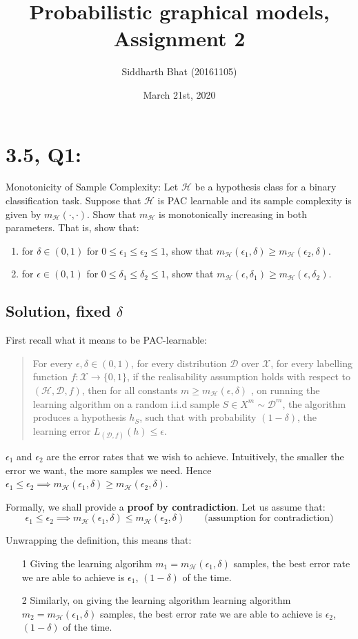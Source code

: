 \documentclass[11pt]{article}
\title{Probabilistic graphical models, Assignment 2}
\author{Siddharth Bhat (20161105)}
\date{March 21st, 2020}
\newcommand{\D}{\ensuremath{\mathcal{D}}}
\renewcommand{\H}{\ensuremath{\mathcal{H}}}
\newcommand{\X}{\ensuremath{\mathcal{X}}}
\begin{document}
\section*{3.5, Q1:}
Monotonicity of Sample Complexity: Let $\H$ be a hypothesis class for a
binary classification task. Suppose that $\H$ is PAC learnable and its sample
complexity is given by $m_\H (\cdot, \cdot)$. Show that $m_\H$ is monotonically
increasing in both parameters. That is, show that:
\begin{enumerate}
    \item for $\delta \in (0, 1)$ for $0 \leq \epsilon_1 \leq \epsilon_2 \leq 1$,
        show that $m_\H(\epsilon_1, \delta) \geq m_\H(\epsilon_2, \delta)$.
    \item  for $\epsilon \in (0, 1)$ for $0 \leq \delta_1 \leq \delta_2 \leq 1$,
        show that $m_\H(\epsilon, \delta_1) \geq m_\H(\epsilon, \delta_2)$.
\end{enumerate}
\subsection*{Solution, fixed $\delta$}
First recall what it means to be PAC-learnable:

\begin{quote}
For every $\epsilon, \delta \in (0, 1)$, for every distribution $\D$ over $\X$,
for every labelling function $f: \X \rightarrow \{0, 1\}$, if the realisability
assumption holds with respect to $(\H, \D, f)$, then for all constants
$m \geq m_\H(\epsilon, \delta)$ , on running the learning algorithm on
a random i.i.d sample $S \in X^m \sim \D^m$, the algorithm produces a hypothesis
$h_S$, such that with probability $(1 - \delta)$, the learning error 
$L_{(\D, f)}(h) \leq \epsilon$.
\end{quote}

$\epsilon_1$ and $\epsilon_2$ are the error rates that we wish to achieve.
Intuitively, the smaller the error we want, the more samples we need. 
Hence $\epsilon_1 \leq \epsilon_2 \implies m_\H(\epsilon_1, \delta) \geq m_\H(\epsilon_2, \delta)$.

Formally, we shall provide a \textbf{proof by contradiction}. Let us
assume that:
$$
\epsilon_1 \leq \epsilon_2 \implies m_\H(\epsilon_1, \delta) \leq m_\H(\epsilon_2, \delta) \qquad 
\text{(assumption for contradiction)}
$$

Unwrapping the definition, this means that:

\begin{itemize}
    \item[1] Giving the learning algorihm $m_1 = m_\H(\epsilon_1, \delta)$
        samples, the best error rate we are able to achieve is $\epsilon_1$,
        $(1- \delta)$ of the time.
    \item[2] Similarly, on giving the learning algorithm learning algorithm
        $m_2 = m_\H(\epsilon_1, \delta)$ samples, the best error rate we are able to
        achieve is $\epsilon_2$, $(1- \delta)$ of the time.
\end{itemize}
\end{document}
